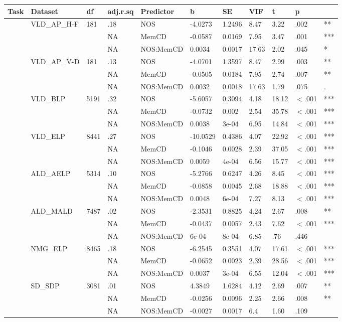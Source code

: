 \begin{table}[ht]
\centering
\begingroup\normalsize
\begin{tabular}{lllllllllll}
  \hline
Task & Dataset & df & adj.r.sq & Predictor & b & SE & VIF & t & p &  \\ 
  \hline
 & VLD\_AP\_H-F & 181 & .18 & NOS & -4.0273 & 1.2496 & 8.47 & 3.22 & .002 & ** \\ 
   &  &  & NA & MemCD & -0.0587 & 0.0169 & 7.95 & 3.47 & .001 & *** \\ 
   &  &  & NA & NOS:MemCD & 0.0034 & 0.0017 & 17.63 & 2.02 & .045 & * \\ 
   & VLD\_AP\_V-D & 181 & .13 & NOS & -4.0701 & 1.3597 & 8.47 & 2.99 & .003 & ** \\ 
   &  &  & NA & MemCD & -0.0505 & 0.0184 & 7.95 & 2.74 & .007 & ** \\ 
   &  &  & NA & NOS:MemCD & 0.0032 & 0.0018 & 17.63 & 1.79 & .075 & . \\ 
   & VLD\_BLP & 5191 & .32 & NOS & -5.6057 & 0.3094 & 4.18 & 18.12 & $<$.001 & *** \\ 
   &  &  & NA & MemCD & -0.0732 & 0.002 & 2.54 & 35.78 & $<$.001 & *** \\ 
   &  &  & NA & NOS:MemCD & 0.0038 & 3e-04 & 6.95 & 14.84 & $<$.001 & *** \\ 
   & VLD\_ELP & 8441 & .27 & NOS & -10.0529 & 0.4386 & 4.07 & 22.92 & $<$.001 & *** \\ 
   &  &  & NA & MemCD & -0.1046 & 0.0028 & 2.39 & 37.05 & $<$.001 & *** \\ 
   &  &  & NA & NOS:MemCD & 0.0059 & 4e-04 & 6.56 & 15.77 & $<$.001 & *** \\ 
   & ALD\_AELP & 5314 & .10 & NOS & -5.2766 & 0.6247 & 4.26 & 8.45 & $<$.001 & *** \\ 
   &  &  & NA & MemCD & -0.0858 & 0.0045 & 2.68 & 18.88 & $<$.001 & *** \\ 
   &  &  & NA & NOS:MemCD & 0.0048 & 6e-04 & 7.27 & 8.13 & $<$.001 & *** \\ 
   & ALD\_MALD & 7487 & .02 & NOS & -2.3531 & 0.8825 & 4.24 & 2.67 & .008 & ** \\ 
   &  &  & NA & MemCD & -0.0437 & 0.0057 & 2.43 & 7.62 & $<$.001 & *** \\ 
   &  &  & NA & NOS:MemCD & 6e-04 & 8e-04 & 6.85 & .76 & .446 &   \\ 
   & NMG\_ELP & 8465 & .18 & NOS & -6.2545 & 0.3551 & 4.07 & 17.61 & $<$.001 & *** \\ 
   &  &  & NA & MemCD & -0.0652 & 0.0023 & 2.39 & 28.56 & $<$.001 & *** \\ 
   &  &  & NA & NOS:MemCD & 0.0037 & 3e-04 & 6.55 & 12.04 & $<$.001 & *** \\ 
   & SD\_SDP & 3081 & .01 & NOS & 4.3849 & 1.6284 & 4.12 & 2.69 & .007 & ** \\ 
   &  &  & NA & MemCD & -0.0256 & 0.0096 & 2.25 & 2.66 & .008 & ** \\ 
   &  &  & NA & NOS:MemCD & -0.0027 & 0.0017 & 6.4 & 1.60 & .109 &   \\ 
   \hline
\end{tabular}
\endgroup
\end{table}
